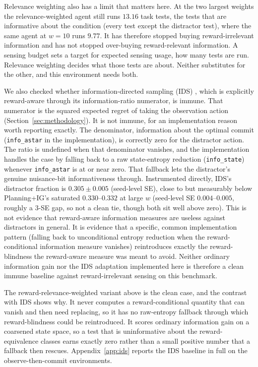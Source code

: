 Relevance weighting also has a limit that matters here. At the two largest weights the relevance-weighted agent still runs $13.16$ task tests, the tests that are informative about the condition (every test except the distractor test), where the same agent at $w{=}10$ runs $9.77$. It has therefore stopped buying reward-irrelevant information and has not stopped over-buying reward-relevant information. A sensing budget sets a target for expected sensing usage, how many tests are run. Relevance weighting decides what those tests are about. Neither substitutes for the other, and this environment needs both.



We also checked whether information-directed sampling (IDS) \citep{russo2014}, which is explicitly reward-aware through its information-ratio numerator, is immune. That numerator is the squared expected regret of taking the observation action (Section~\ref{sec:methodology}). It is not immune, for an implementation reason worth reporting exactly. The denominator, information about the optimal commit (\texttt{info\_\allowbreak astar} in the implementation), is correctly zero for the distractor action. The ratio is undefined when that denominator vanishes, and the implementation handles the case by falling back to a raw state-entropy reduction (\texttt{info\_\allowbreak state}) whenever \texttt{info\_\allowbreak astar} is at or near zero. That fallback lets the distractor's genuine nuisance-bit informativeness through. Instrumented directly, IDS's distractor fraction is $0.305 \pm 0.005$ (seed-level SE), close to but measurably below Planning+IG's saturated $0.330$--$0.332$ at large $w$ (seed-level SE $0.004$--$0.005$, roughly a $3$-SE gap, so not a clean tie, though both sit well above zero). This is not evidence that reward-aware information measures are useless against distractors in general. It is evidence that a specific, common implementation pattern (falling back to unconditional entropy reduction when the reward-conditional information measure vanishes) reintroduces exactly the reward-blindness the reward-aware measure was meant to avoid. Neither ordinary information gain nor the IDS adaptation implemented here is therefore a clean immune baseline against reward-irrelevant sensing on this benchmark.

The reward-relevance-weighted variant above is the clean case, and the contrast with IDS shows why. It never computes a reward-conditional quantity that can vanish and then need replacing, so it has no raw-entropy fallback through which reward-blindness could be reintroduced. It scores ordinary information gain on a coarsened state space, so a test that is uninformative about the reward-equivalence classes earns exactly zero rather than a small positive number that a fallback then rescues. Appendix~\ref{app:ids} reports the IDS baseline in full on the observe-then-commit environments.

